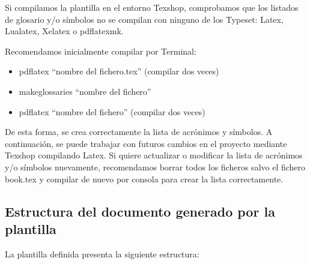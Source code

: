 Si compilamos la plantilla en el entorno Texshop, comprobamos que los listados de glosario y/o símbolos no se compilan con ninguno de los Typeset: Latex, Lualatex, Xelatex o pdflatexmk.

Recomendamos inicialmente compilar por Terminal:

\begin{itemize}
  \item pdflatex “nombre del fichero.tex” (compilar dos veces)
  \item makeglossaries “nombre del fichero”
  \item pdflatex “nombre del fichero” (compilar dos veces)
\end{itemize}

De esta forma, se crea correctamente la lista de acrónimos y símbolos. A continuación, se puede trabajar con futuros cambios en el proyecto mediante Texshop compilando Latex. Si quiere actualizar o modificar la lista de acrónimos y/o símbolos nuevamente, recomendamos borrar todos los ficheros salvo el fichero book.tex y compilar de nuevo por consola para crear la lista correctamente.



\subsection{Estructura del documento generado por la plantilla}
\label{sec:estr-del-docum}

La plantilla definida presenta la siguiente estructura:


